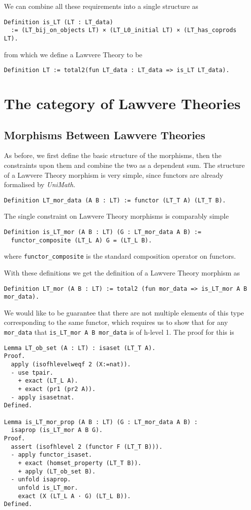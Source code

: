 We can combine all these requirements into a single structure as
\begin{lstlisting}
Definition is_LT (LT : LT_data)
  := (LT_bij_on_objects LT) × (LT_L0_initial LT) × (LT_has_coprods LT).
\end{lstlisting}
from which we define a Lawvere Theory to be
\begin{lstlisting}
Definition LT := total2(fun LT_data : LT_data => is_LT LT_data).
\end{lstlisting}

\section{The category of Lawvere Theories}
\subsection{Morphisms Between Lawvere Theories}
As before, we first define the basic structure of the morphisms, then the
constraints upon them and combine the two as a dependent sum. The structure of a
Lawvere Theory morphism is very simple, since functors are already formalised by
\textit{UniMath}.
\begin{lstlisting}
Definition LT_mor_data (A B : LT) := functor (LT_T A) (LT_T B).
\end{lstlisting}

The single constraint on Lawvere Theory morphisms is comparably simple
\begin{lstlisting}
Definition is_LT_mor (A B : LT) (G : LT_mor_data A B) := 
  functor_composite (LT_L A) G = (LT_L B).
\end{lstlisting}
where \lstinline|functor_composite| is the standard composition operator on functors.

With these definitions we get the definition of a Lawvere Theory morphism as
\begin{lstlisting}
Definition LT_mor (A B : LT) := total2 (fun mor_data => is_LT_mor A B mor_data).
\end{lstlisting}

We would like to be guarantee that there are not multiple elements of this type
corresponding to the same functor, which requires us to show that for any
\lstinline|mor_data| that \lstinline|is_LT_mor A B mor_data| is
of h-level 1. The proof for this is
\begin{lstlisting}
Lemma LT_ob_set (A : LT) : isaset (LT_T A).
Proof.
  apply (isofhlevelweqf 2 (X:=nat)).
  - use tpair.
    + exact (LT_L A).
    + exact (pr1 (pr2 A)).
  - apply isasetnat.
Defined.

Lemma is_LT_mor_prop (A B : LT) (G : LT_mor_data A B) : 
  isaprop (is_LT_mor A B G).
Proof.
  assert (isofhlevel 2 (functor F (LT_T B))).
  - apply functor_isaset.
    + exact (homset_property (LT_T B)).
    + apply (LT_ob_set B).
  - unfold isaprop.
    unfold is_LT_mor.
    exact (X (LT_L A · G) (LT_L B)).
Defined.
\end{lstlisting}

